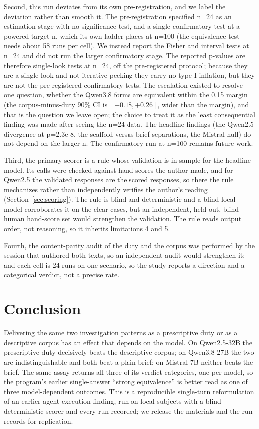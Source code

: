 \documentclass[11pt,a4paper]{article}
\begin{document}
Second, this run deviates from its own pre-registration, and we label the deviation rather
than smooth it. The pre-registration specified n=24 as an estimation stage with no
significance test, and a single confirmatory test at a powered target n, which its own
ladder places at n=100 (the equivalence test needs about 58 runs per cell). We instead
report the Fisher and interval tests at n=24 and did not run the larger confirmatory
stage. The reported p-values are therefore single-look tests at n=24, off the
pre-registered protocol; because they are a single look and not iterative peeking they
carry no type-I inflation, but they are not the pre-registered confirmatory tests. The
escalation existed to resolve one question, whether the Qwen3.8 forms are equivalent within
the 0.15 margin (the corpus-minus-duty 90\% CI is $[-0.18, +0.26]$, wider than the
margin), and that is the question we leave open; the choice to treat it as the least
consequential finding was made after seeing the n=24 data. The headline findings (the
Qwen2.5 divergence at p=2.3e-8, the scaffold-versus-brief separations, the Mistral null)
do not depend on the larger n. The confirmatory run at n=100 remains future work.

Third, the primary scorer is a rule whose validation is in-sample for the headline model.
Its calls were checked against hand-scores the author made, and for Qwen2.5 the validated
responses are the scored responses, so there the rule mechanizes rather than independently
verifies the author's reading (Section~\ref{sec:scoring}). The rule is blind and
deterministic and a blind local model corroborates it on the clear cases, but an
independent, held-out, blind human hand-score set would strengthen the validation. The
rule reads output order, not reasoning, so it inherits limitations 4 and 5.

Fourth, the content-parity audit of the duty and the corpus was performed by the session
that authored both texts, so an independent audit would strengthen it; and each cell is
24 runs on one scenario, so the study reports a direction and a categorical verdict, not
a precise rate.

\section{Conclusion}

Delivering the same two investigation patterns as a prescriptive duty or as a descriptive
corpus has an effect that depends on the model. On Qwen2.5-32B the prescriptive duty
decisively beats the descriptive corpus; on Qwen3.8-27B the two are indistinguishable and
both beat a plain brief; on Mistral-7B neither beats the brief. The same assay returns all
three of its verdict categories, one per model, so the program's earlier single-answer
``strong equivalence'' is better read as one of three model-dependent outcomes. This is a
reproducible single-turn reformulation of an earlier agent-execution finding, run on local
subjects with a blind deterministic scorer and every run recorded; we release the
materials and the run records for replication.
\end{document}
